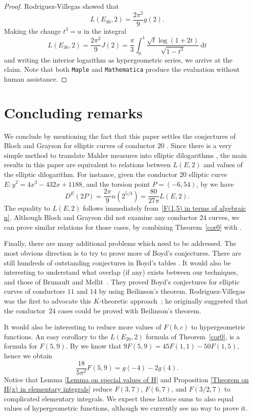 \documentclass[12pt,reqno]{amsart}
\theoremstyle{remark}
\begin{document}
\begin{proof}
Rodriguez-Villegas \cite{RV} showed that
$$
L(E_{36},2)=\frac{2\pi^2}9g(2).
$$
Making the change $t^3=u$ in the integral
$$
L(E_{36},2)=\frac{2\pi^2}9 J(2) =\frac\pi3\int_0^1\frac{\sqrt
t\log(1+2t)}{\sqrt{1-t^3}}\,{{\mathrm d}} t
$$
and writing the interior logarithm as hypergeometric series,
we arrive at the claim. Note that both \texttt{Maple} and \texttt{Mathematica}
produce the evaluation without human assistance.
\end{proof}

\section{Concluding remarks}
\label{sec5}

We conclude by mentioning the fact that this paper settles the
conjectures of Bloch and Grayson for elliptic curves of conductor
$20$ \cite{BG}.  Since there is a very simple method to translate
Mahler measures into elliptic dilogarithms \cite{GuR}, the main
results in this paper are equivalent to relations between $L(E,2)$
and values of the elliptic dilogarithm. For instance, given the
conductor $20$ elliptic curve $E: y^2=4x^3-432 x+1188$, and the
torsion point $P=(-6,54)$, by \cite[~Theorem 4]{GuR} we have
\begin{equation*}
D^{E}(2P)=\frac{2\pi}{9}n(2^{5/3})=\frac{80}{27\pi}L(E,2).
\end{equation*}
The equality to $L(E,2)$ follows immediately from~\eqref{F(1,5) in
terms of algebraic n}.  Although Bloch and Grayson did not examine
any conductor $24$ curves, we can prove similar relations for
those cases, by combining Theorem~\ref{cor0} with \cite[~Theorem 4]{GuR}.

Finally, there are many additional problems which need to be
addressed. The most obvious direction is to try to prove more of
Boyd's conjectures. There are still hundreds of outstanding
conjectures in Boyd's tables \cite{Bo1}.  It would also be
interesting to understand what overlap (if any) exists between our
techniques, and those of Brunault \cite{Br} and Mellit~\cite{Me}.
They proved Boyd's conjectures for elliptic curves of conductors
$11$ and $14$ by using Beilinson's theorem. Rodriguez-Villegas was
the first to advocate this $K$-theoretic approach~\cite{RV}; he originally
suggested that the conductor~$24$ cases could be proved with
Beilinson's theorem.

It would also be interesting to reduce more values of $F(b,c)$ to
hypergeometric functions. An easy corollary to the $L(E_{20},2)$
formula of Theorem~\ref{cor0}, is a formula for $F(5,9)$. By
\cite{Rgsumbit2} we know that $9 F(5,9)=45 F(1,1)-50 F(1,5)$,
hence we obtain
\begin{equation}
\frac{18}{5\pi^2}F(5,9)=g(-4)-2g(4).
\end{equation}
Notice that Lemma \ref{Lemma on special values of H} and
Proposition \ref{Theorem on H(x) in elementary integrals} reduce
$F(3,7)$, $F(6,7)$, and $F(3/2,7)$ to complicated elementary
integrals. We expect these lattice sums to also equal values of
hypergeometric functions, although we currently see no way to
prove it.
\end{document}
